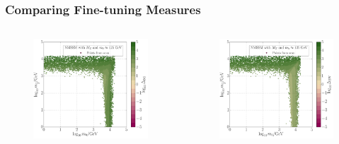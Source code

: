 \documentclass[10pt,aspectratio=169]{beamer}
\begin{document}
\begin{frame}
  \frametitle{Comparing Fine-tuning Measures}
  \begin{columns}[t]
    \begin{column}{0.3\textwidth}
      \begin{figure}
        \centering
        \includegraphics[width=\textwidth]{CNMSSM_BG_mh_m0m12}
      \end{figure}
    \end{column}
    \begin{column}{0.3\textwidth}
      \begin{figure}
        \centering
        \includegraphics[width=\textwidth]{CNMSSM_EW_mh_m0m12}

\end{figure}
\end{column}
\end{columns}
\end{frame}
\end{document}
